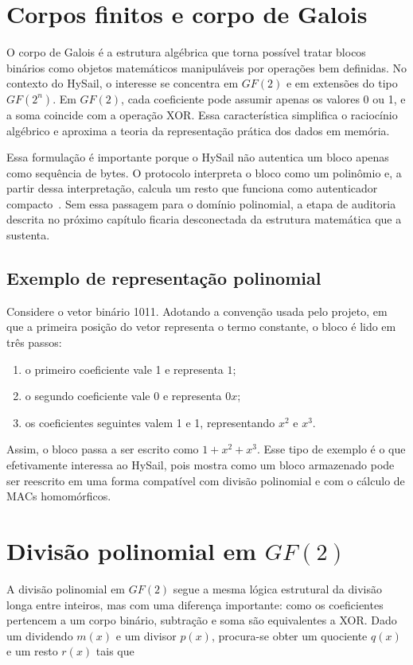 \section{Corpos finitos e corpo de Galois}%
O corpo de Galois é a estrutura algébrica que torna possível tratar blocos binários como objetos matemáticos manipuláveis por operações bem definidas. No contexto do HySail, o interesse se concentra em $GF(2)$ e em extensões do tipo $GF(2^n)$. Em $GF(2)$, cada coeficiente pode assumir apenas os valores 0 ou 1, e a soma coincide com a operação XOR. Essa característica simplifica o raciocínio algébrico e aproxima a teoria da representação prática dos dados em memória.

Essa formulação é importante porque o HySail não autentica um bloco apenas como sequência de bytes. O protocolo interpreta o bloco como um polinômio e, a partir dessa interpretação, calcula um resto que funciona como autenticador compacto~\cite{amaral2013hysail}. Sem essa passagem para o domínio polinomial, a etapa de auditoria descrita no próximo capítulo ficaria desconectada da estrutura matemática que a sustenta.

\subsection{Exemplo de representação polinomial}%
Considere o vetor binário 1011. Adotando a convenção usada pelo projeto, em que a primeira posição do vetor representa o termo constante, o bloco é lido em três passos:

\begin{enumerate}
	\item o primeiro coeficiente vale 1 e representa $1$;
	\item o segundo coeficiente vale 0 e representa $0x$;
	\item os coeficientes seguintes valem 1 e 1, representando $x^2$ e $x^3$.
\end{enumerate}

Assim, o bloco passa a ser escrito como $1 + x^2 + x^3$. Esse tipo de exemplo é o que efetivamente interessa ao HySail, pois mostra como um bloco armazenado pode ser reescrito em uma forma compatível com divisão polinomial e com o cálculo de MACs homomórficos.

\section[Divisão polinomial em GF(2)]{Divisão polinomial em $GF(2)$}%
A divisão polinomial em $GF(2)$ segue a mesma lógica estrutural da divisão longa entre inteiros, mas com uma diferença importante: como os coeficientes pertencem a um corpo binário, subtração e soma são equivalentes a XOR. Dado um dividendo $m(x)$ e um divisor $p(x)$, procura-se obter um quociente $q(x)$ e um resto $r(x)$ tais que

